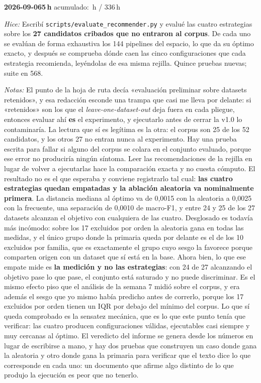 \documentclass[11pt,letterpaper]{article}
\newcommand{\presupuesto}{336}
\newcommand{\horasacum}{0}
\newcommand{\entrada}[4]{%
  \xdef\horasacum{\fpeval{\horasacum + #2}}%
  \par\medskip
  \noindent\textbf{\color{tecnavy}#1}\quad\textbf{#2\,h}%
  \hfill{\small\color{gris}acumulado: \horasacum\,h / \presupuesto\,h}\par
  \nopagebreak
  \noindent\textit{Hice:} #3\par
  \nopagebreak
  \noindent\textit{Notas:} #4\par
}
\begin{document}
\entrada{2026-09-06}{5}
{Escribí \texttt{scripts/evaluate\_recommender.py} y evalué las cuatro estrategias sobre
 los \textbf{27 candidatos cribados que no entraron al corpus}. De cada uno se evalúan de
 forma exhaustiva los 144 pipelines del espacio, lo que da su óptimo exacto, y después se
 comprueba dónde caen las cinco configuraciones que cada estrategia recomienda, leyéndolas
 de esa misma rejilla. Quince pruebas nuevas; suite en 568.}
{El punto de la hoja de ruta decía «evaluación preliminar sobre datasets retenidos», y esa
 redacción esconde una trampa que casi me lleva por delante: si «retenidos» son los que el
 \textit{leave-one-dataset-out} deja fuera en cada pliegue, entonces evaluar ahí
 \textbf{es} el experimento, y ejecutarlo antes de cerrar la v1.0 lo contaminaría. La
 lectura que sí es legítima es la otra: el corpus son 25 de los 52 candidatos, y los otros
 27 no entran nunca al experimento. Hay una prueba escrita para fallar si alguno del corpus
 se colara en el conjunto evaluado, porque ese error no produciría ningún síntoma. Leer las
 recomendaciones de la rejilla en lugar de volver a ejecutarlas hace la comparación exacta
 y no cuesta cómputo. El resultado no es el que esperaba y conviene registrarlo tal cual:
 \textbf{las cuatro estrategias quedan empatadas y la ablación aleatoria va nominalmente
 primera}. La distancia mediana al óptimo va de 0,0015 con la aleatoria a 0,0025 con la
 frecuente, una separación de 0,0010 de macro-F1, y entre 24 y 25 de los 27 datasets
 alcanzan el objetivo con cualquiera de las cuatro. Desglosado es todavía más incómodo:
 sobre los 17 excluidos por orden la aleatoria gana en todas las medidas, y el único grupo
 donde la primaria queda por delante es el de los 10 excluidos por familia, que es
 exactamente el grupo cuyo sesgo la favorece porque comparten origen con un dataset que sí
 está en la base. Ahora bien, lo que ese empate mide es \textbf{la medición y no las
 estrategias}: con 24 de 27 alcanzando el objetivo pase lo que pase, el conjunto está
 saturado y no puede discriminar. Es el mismo efecto piso que el análisis de la semana 7
 midió sobre el corpus, y era además el sesgo que yo mismo había predicho antes de correrlo,
 porque los 17 excluidos por orden tienen un IQR por debajo del mínimo del corpus. Lo que sí
 queda comprobado es la sensatez mecánica, que es lo que este punto tenía que verificar: las
 cuatro producen configuraciones válidas, ejecutables casi siempre y muy cercanas al óptimo.
 El veredicto del informe se genera desde los números en lugar de escribirse a mano, y hay
 dos pruebas que construyen un caso donde gana la aleatoria y otro donde gana la primaria
 para verificar que el texto dice lo que corresponde en cada uno: un documento que afirme
 algo distinto de lo que produjo la ejecución es peor que no tenerlo.}
\end{document}

